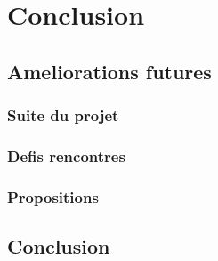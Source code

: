 \chapter{Conclusion}
        \section{Ameliorations futures}
        \subsection{Suite du projet}
        \lipsum[1]
         \subsection{Defis rencontres}
        \lipsum[1]
         \subsection{Propositions}
        \lipsum[1]
        \section{Conclusion}
                     
